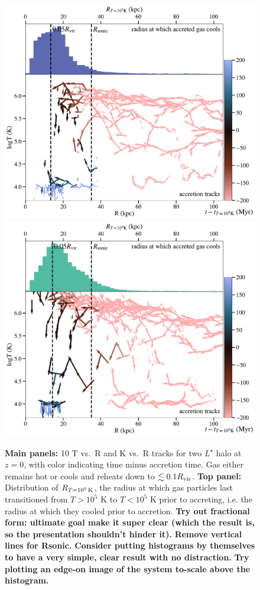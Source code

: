 \documentclass[fleqn,usenatbib]{mnras}
\newcommand{\Rcool}{R_{T=10^5\,{\rm K}}}
\begin{document}
\begin{figure}
    \centering
    \includegraphics[width=\columnwidth]{figures/tracks_m12i_md.pdf}
    \includegraphics[width=\columnwidth]{figures/tracks_m12b_md.pdf}
    \caption{
    \textbf{Main panels:} 10 T vs.\ R and K vs.\ R tracks for two $L^\star$ halo at $z=0$, with color indicating time minus accretion time.
    Gas either remains hot or cools and reheats down to $\lesssim 0.1 R_{\rm vir}$. 
    \textbf{Top panel:} Distribution of $\Rcool$, the radius at which gas particles last transitioned from $T > 10^5$ K to $T < 10^5$ K prior to accreting, i.e. the radius at which they cooled prior to accretion.
    \textbf{Try out fractional form: ultimate goal make it super clear (which the result is, so the presentation shouldn't hinder it).}
    \textbf{Remove vertical lines for Rsonic.}
    \textbf{Consider putting histograms by themselves to have a very simple, clear result with no distraction.}
    \textbf{
    Try plotting an edge-on image of the system to-scale above the histogram.
    }
    }
    \label{f: T vs R}
\end{figure}
\end{document}
